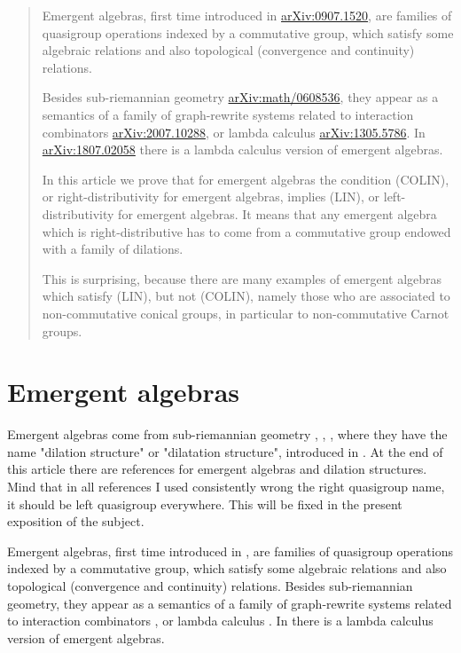 \documentclass{article}
\begin{document}
\begin{abstract}
Emergent algebras, first time introduced in \href{https://arxiv.org/abs/0907.1520}{arXiv:0907.1520}, are families of quasigroup operations indexed by a commutative group, which satisfy some algebraic relations and also topological (convergence and continuity) relations. 

Besides sub-riemannian geometry \href{https://arxiv.org/abs/math/0608536}{arXiv:math/0608536}, they appear as a semantics of a family of graph-rewrite systems related to interaction combinators \href{https://arxiv.org/abs/2007.10288}{arXiv:2007.10288}, or lambda calculus \href{https://arxiv.org/abs/1305.5786}{arXiv:1305.5786}. In \href{https://arxiv.org/abs/1807.02058}{arXiv:1807.02058} there is a lambda calculus version of emergent algebras.

In this article we prove that for emergent algebras the condition (COLIN), or right-distributivity for emergent algebras, implies (LIN), or left-distributivity for emergent algebras. It means that any emergent algebra which is right-distributive has to come from a commutative group endowed with a family of dilations.

This is surprising, because there are many examples of emergent algebras which satisfy (LIN), but not (COLIN), namely those who are associated to non-commutative conical groups, in particular to non-commutative Carnot groups. 
\end{abstract}






\section{Emergent algebras}

Emergent  algebras come from sub-riemannian geometry \cite{buligasub}, \cite{buligainf},  \cite{buligabraided}, where they have the name "dilation structure" or "dilatation structure", introduced in \cite{buligadil1}. 
At the end of this article there are references for emergent algebras and dilation structures. Mind that in all references I used consistently wrong the right quasigroup name, it should be left quasigroup everywhere. This will be fixed in the present exposition of the subject. 

Emergent algebras, first time introduced in \cite{buligairq},  are families of quasigroup operations indexed by a commutative group, which satisfy some algebraic relations and also topological (convergence and continuity) relations. Besides sub-riemannian geometry, they appear as a semantics of a family of graph-rewrite systems related to interaction combinators \cite{buligahis}, or lambda calculus \cite{buligaglc}. In \cite{buligaem} there is a lambda calculus version of emergent algebras. 
\end{document}
